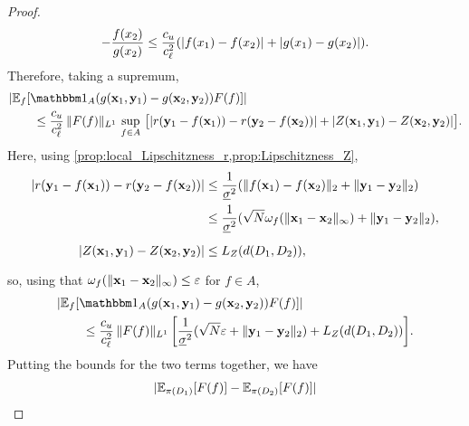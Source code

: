 \documentclass[12pt]{report}
\begin{document}
\begin{proof}
\begin{equation}
{            -
            \frac{f(x_2)}{g(x_2)}
        }
        \le \frac{c_u}{c_\ell^2}\parens*{
            \abs{f(x_1) - f(x_2)}
            + \abs{g(x_1) - g(x_2)}
        }.
    \end{equation}
    Therefore, taking a supremum,
    \begin{align}
        &\abs{\E_f\sbrac{
            \ind_A\parens{
                g(\vx_1, \vy_1)
                - g(\vx_2, \vy_2)
            }
            F(f)
        }} \\
        &\qquad\le 
            \frac{c_u}{c_\ell^2}
            \,
            \norm{F(f)}_{L^1}
            \,
            \sup_{f \in A}
            \,\big[
                \abs{
                    r(\vy_1 - f(\vx_1))
                    - r(\vy_2 - f(\vx_2))
                }
                + \abs{Z(\vx_1, \vy_1) - Z(\vx_2, \vy_2)}
            \big]. \nonumber
    \end{align}
    Here, using \cref{prop:local_Lipschitzness_r,prop:Lipschitzness_Z},
    \begin{align}
        \abs{
            r(\vy_1 - f(\vx_1))
            - r(\vy_2 - f(\vx_2))
        }
        &\le \frac{1}{\underline{\sigma}^2}(
            \norm{f(\vx_1) - f(\vx_2)}_2
            + \norm{\vy_1 - \vy_2}_2
        ) \\
        &\le \frac{1}{\underline{\sigma}^2}(
            \sqrt{N}\omega_f(\norm{\vx_1 - \vx_2}_\infty)
            + \norm{\vy_1 - \vy_2}_2
        ), \\
        \abs{Z(\vx_1, \vy_1) - Z(\vx_2, \vy_2)}
        &\le \vphantom{\frac{1}{}} L_Z(d(D_1, D_2)),
    \end{align}
    so, using that $\omega_f(\lVert\mathbf{x}_1 - \mathbf{x}_2\rVert_\infty) \le \varepsilon$ for $f \in A$,
    \begin{align}
        &\abs{\E_f\sbrac{
            \ind_A\parens{
                g(\vx_1, \vy_1)
                - g(\vx_2, \vy_2)
            }
            F(f)
        }} \nonumber \\
        &\qquad
            \le 
            \frac{c_u}{c_\ell^2}
            \,\norm{F(f)}_{L^1}
            \,\sbrac*{
                \frac{1}{\underline{\sigma}^2}(
                    \sqrt{N}\e
                    + \norm{\vy_1 - \vy_2}_2
                )
                + L_Z(d(D_1, D_2))
            }.
    \end{align}
    Putting the bounds for the two terms together, we have
    \begin{align}
        &\abs{\E_{\pi(D_1)}[F(f)] - \E_{\pi(D_2)}[F(f)]} \nonumber \\

\end{align}
\end{proof}
\end{document}
